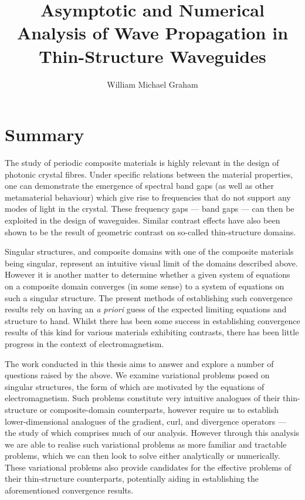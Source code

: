 \documentclass[a4paper]{report}
\title{Asymptotic and Numerical Analysis of Wave Propagation in Thin-Structure Waveguides}
\author{William Michael Graham}
\begin{document}
\maketitle


\License

\chapter*{Summary}
The study of periodic composite materials is highly relevant in the design of photonic crystal fibres.
Under specific relations between the material properties, one can demonstrate the emergence of spectral band gaps (as well as other metamaterial behaviour) which give rise to frequencies that do not support any modes of light in the crystal.
These frequency gaps --- band gaps --- can then be exploited in the design of waveguides.
Similar contrast effects have also been shown to be the result of geometric contrast on so-called thin-structure domains.

Singular structures, and composite domains with one of the composite materials being singular, represent an intuitive visual limit of the domains described above.
However it is another matter to determine whether a given system of equations on a composite domain converges (in some sense) to a system of equations on such a singular structure.
The present methods of establishing such convergence results rely on having an \emph{a priori} guess of the expected limiting equations and structure to hand.
Whilst there has been some success in establishing convergence results of this kind for various materials exhibiting contrasts, there has been little progress in the context of electromagnetism.

The work conducted in this thesis aims to answer and explore a number of questions raised by the above.
We examine variational problems posed on singular structures, the form of which are motivated by the equations of electromagnetism.
Such problems constitute very intuitive analogues of their thin-structure or composite-domain counterparts, however require us to establish lower-dimensional analogues of the gradient, curl, and divergence operators --- the study of which comprises much of our analysis.
However through this analysis we are able to realise such variational problems as more familiar and tractable problems, which we can then look to solve either analytically or numerically.
These variational problems also provide candidates for the effective problems of their thin-structure counterparts, potentially aiding in establishing the aforementioned convergence results.  
\end{document}

